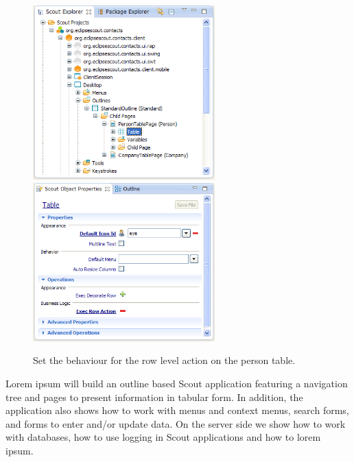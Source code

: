 \documentclass[a4paper,10pt,twoside]{book}
\begin{document}
\begin{figure}
\includegraphics[width=7cm]{person_table_explorer.png} \hspace{5mm}
\includegraphics[width=7cm]{person_table_properties.png}
\caption{Set the behaviour for the row level action on the person table.}
\end{figure}

Lorem ipsum will build an outline based Scout application featuring a navigation tree and pages to present information in tabular form. 
In addition, the application also shows how to work with menus and context menus, search forms, and forms to enter and/or update data. 
On the server side we show how to work with databases, how to use logging in Scout applications and how to lorem ipsum. 
\end{document}
